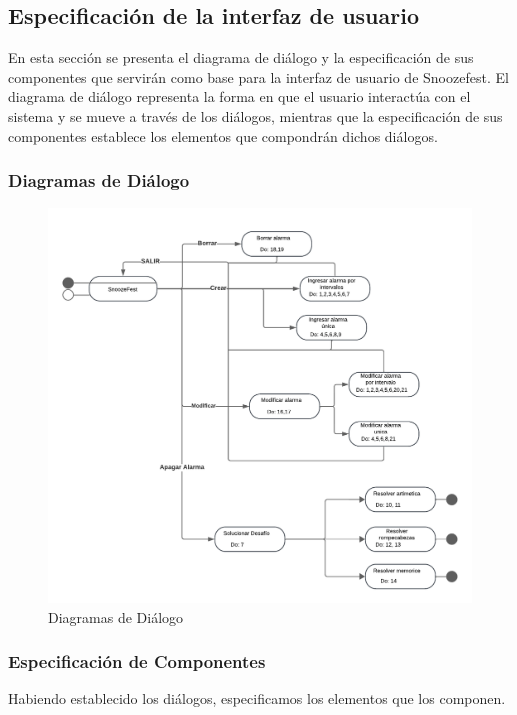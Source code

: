 \subsection{Especificación de la interfaz de usuario}
En esta sección se presenta el diagrama de diálogo y la especificación de sus componentes que servirán como base para la interfaz de usuario de Snoozefest. El diagrama de diálogo representa la forma en que el usuario interactúa con el sistema y se mueve a través de los diálogos, mientras que la especificación de sus componentes establece los elementos que compondrán dichos diálogos.

\subsubsection{Diagramas de Diálogo}
\begin{figure}[H]
	\centering
	\includegraphics[page=1,width=\textwidth]{./img/dialogos.pdf}
	\caption{Diagramas de Diálogo}
        \vspace{10pt}
	\label{fig:Diagrama de Diálogos}
\end{figure}

\subsubsection{Especificación de Componentes}
Habiendo establecido los diálogos, especificamos los elementos que los componen.

